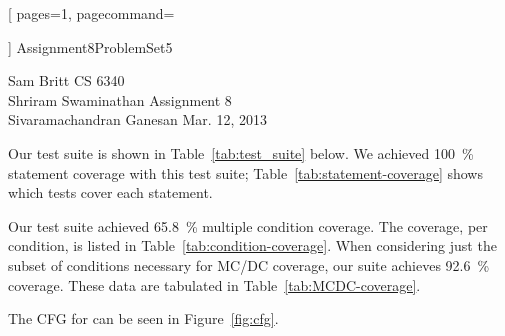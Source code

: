 \documentclass{article}
\newcommand\codefamily{\ttfamily}  %
\newcommand\code[1]{\text{\codefamily #1}}
\begin{document}
\thispagestyle{empty}


  [
    pages=1,
    pagecommand=
      {
      }
  ]
  {Assignment8ProblemSet5}

\clearpage
{}

\noindent
Sam Britt                \hfill CS 6340      \\
Shriram Swaminathan      \hfill Assignment 8 \\
Sivaramachandran Ganesan \hfill Mar. 12, 2013

Our test suite is shown in Table~\ref{tab:test_suite} below. We
achieved \SI{100}{\percent} statement coverage with this test suite;
Table~\ref{tab:statement-coverage} shows which tests cover each
statement.

Our test suite achieved \SI{65.8}{\percent} multiple condition
coverage. The coverage, per condition, is listed in
Table~\ref{tab:condition-coverage}. When considering just the subset
of conditions necessary for MC/DC coverage, our suite achieves
\SI{92.6}{\percent} coverage. These data are tabulated in
Table~\ref{tab:MCDC-coverage}.

The CFG for \code{tritype.c} can be seen in Figure~\ref{fig:cfg}.
\end{document}
